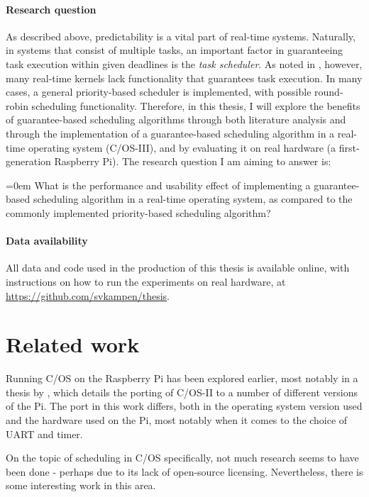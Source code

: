 \documentclass[twoside]{uva-inf-bachelor-thesis}
\newcommand{\ucosiii}{\textmu C/OS-III\xspace}
\newcommand{\ucosii}{\textmu C/OS-II\xspace}
\newcommand{\ucos}{\textmu C/OS\xspace}
\begin{document}
\subsubsection{Research question}
As described above, predictability is a vital part of real-time systems. Naturally, in systems that consist of multiple tasks, an important factor in guaranteeing task execution within given deadlines is the \textit{task scheduler}. As noted in \textcite{buttazzo2011hard}, however, many real-time kernels lack functionality that guarantees task execution. In many cases, a general priority-based scheduler is implemented, with possible round-robin scheduling functionality. Therefore, in this thesis, I will explore the benefits of guarantee-based scheduling algorithms through both literature analysis and through the implementation of a guarantee-based scheduling algorithm in a real-time operating system (\ucosiii), and by evaluating it on real hardware (a first-generation Raspberry Pi). The research question I am aiming to answer is:

\begin{outline}
    \itemsep=0em
    \1 What is the performance and usability effect of implementing a guarantee-based scheduling algorithm in a real-time operating system, as compared to the commonly implemented priority-based scheduling algorithm?
\end{outline}


\subsubsection{Data availability}
All data and code used in the production of this thesis is available online, with instructions on how to run the experiments on real hardware, at \url{https://github.com/svkampen/thesis}.



%
%
%
%

\chapter{Related work}
Running \ucos on the Raspberry Pi has been explored earlier, most notably in a thesis by \textcite{sfd:realpi}, which details the porting of \ucosii to a number of different versions of the Pi. The port in this work differs, both in the operating system version used and the hardware used on the Pi, most notably when it comes to the choice of UART and timer.

On the topic of scheduling in \ucos specifically, not much research seems to have been done - perhaps due to its lack of open-source licensing. Nevertheless, there is some interesting work in this area.
\end{document}
